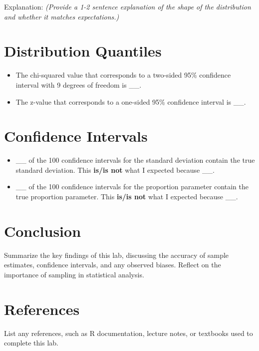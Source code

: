 \documentclass{article}
\begin{document}
Explanation: \textit{(Provide a 1-2 sentence explanation of the shape of the distribution and whether it matches expectations.)}

\section{Distribution Quantiles}

\begin{itemize}
    \item The chi-squared value that corresponds to a two-sided 95\% confidence interval with 9 degrees of freedom is \_\_.
    \item The z-value that corresponds to a one-sided 95\% confidence interval is \_\_.
\end{itemize}

\section{Confidence Intervals}

\begin{itemize}
    \item \_\_ of the 100 confidence intervals for the standard deviation contain the true standard deviation. This \textbf{is/is not} what I expected because \_\_.
    \item \_\_ of the 100 confidence intervals for the proportion parameter contain the true proportion parameter. This \textbf{is/is not} what I expected because \_\_.
\end{itemize}



\section{Conclusion}

Summarize the key findings of this lab, discussing the accuracy of sample estimates, confidence intervals, and any observed biases. Reflect on the importance of sampling in statistical analysis.

\section{References}

List any references, such as R documentation, lecture notes, or textbooks used to complete this lab.
\end{document}
